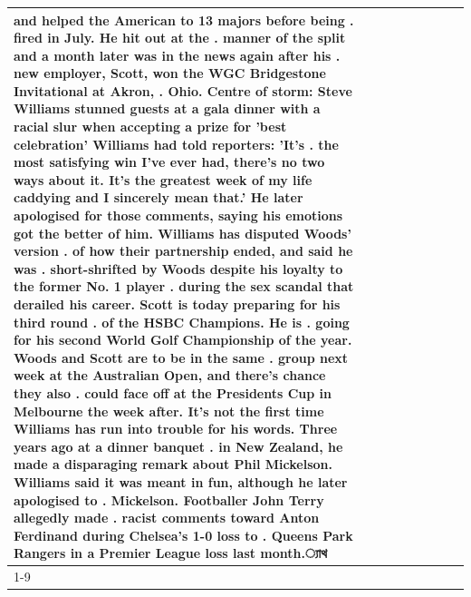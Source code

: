 \begin{table}[H]
\begin{tabular}{lllrlllll}
and helped the American to 13 majors before being . fired in July. He hit out at the . manner of the split and a month later was in the news again after his . new employer, Scott, won the WGC Bridgestone Invitational at Akron, . Ohio. Centre of storm: Steve Williams stunned guests at a gala dinner with a racial slur when accepting a prize for 'best celebration' Williams had told reporters: 'It's . the most satisfying win I've ever had, there's no two ways about it. It's the greatest week of my life caddying and I sincerely mean that.' He later apologised for those comments, saying his emotions got the better of him. Williams has disputed Woods' version . of how their partnership ended, and said he was . short-shrifted by Woods despite his loyalty to the former No. 1 player . during the sex scandal that derailed his career. Scott is today preparing for his third round . of the HSBC Champions. He is . going for his second World Golf Championship of the year. Woods and Scott are to be in the same . group next week at the Australian Open, and there's chance they also . could face off at the Presidents Cup in Melbourne the week after. It's not the first time Williams has run into trouble for his words. Three years ago at a dinner banquet . in New Zealand, he made a disparaging remark about Phil Mickelson. Williams said it was meant in fun, although he later apologised to . Mickelson. Footballer John Terry allegedly made . racist comments toward Anton Ferdinand during Chelsea's 1-0 loss to . Queens Park Rangers in a Premier League loss last month.্যাথ \\
\cline{1-9}

\end{tabular}
\end{table}

